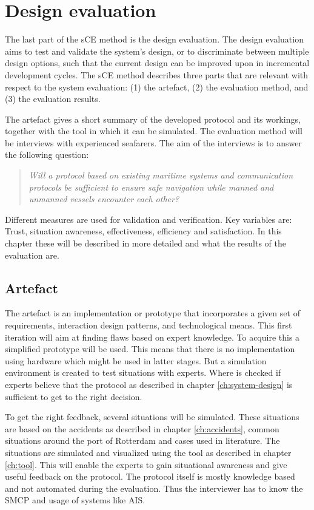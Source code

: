 \chapter{Design evaluation}
The last part of the sCE method is the design evaluation. The design evaluation aims to test and validate the system’s design, or to discriminate between multiple design options, such that the current design can be improved upon in incremental development cycles. The sCE method describes three parts that are relevant with respect to the system evaluation: (1) the artefact, (2) the evaluation method, and (3) the evaluation results.

The artefact gives a short summary of the developed protocol and its workings, together with the tool in which it can be simulated. The evaluation method will be interviews with experienced seafarers. The aim of the interviews is to answer the following question:
\begin{quotation}
	\emph{Will a protocol based on existing maritime systems and communication protocols be sufficient to ensure safe navigation while manned and unmanned vessels encounter each other?}
\end{quotation}
Different measures are used for validation and verification. Key variables are: Trust, situation awareness, effectiveness, efficiency and satisfaction. In this chapter these will be described in more detailed and what the results of the evaluation are.

\section{Artefact}
The artefact is an implementation or prototype that incorporates a given set of requirements, interaction design patterns, and technological means. This first iteration will aim at finding flaws based on expert knowledge. To acquire this a simplified prototype will be used. This means that there is no implementation using hardware which might be used in latter stages. But a simulation environment is created to test situations with experts. Where is checked if experts believe that the protocol as described in chapter \ref{ch:system-design} is sufficient to get to the right decision. 

To get the right feedback, several situations will be simulated. These situations are based on the accidents as described in chapter \ref{ch:accidents}, common situations around the port of Rotterdam and cases used in literature. The situations are simulated and visualized using the tool as described in chapter \ref{ch:tool}. This will enable the experts to gain situational awareness and give useful feedback on the protocol. The protocol itself is mostly knowledge based and not automated during the evaluation. Thus the interviewer has to know the \acf{SMCP} and usage of systems like \acf{AIS}.

